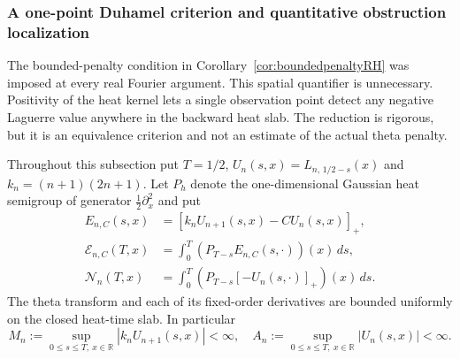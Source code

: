 \subsubsection{A one-point Duhamel criterion and quantitative obstruction localization}
\label{sec:onepointduhamel}
The bounded-penalty condition in Corollary~\ref{cor:boundedpenaltyRH}
was imposed at every real Fourier argument.  This spatial
quantifier is unnecessary.  Positivity of the heat kernel
lets a single observation point detect any negative
Laguerre value anywhere in the backward heat slab.
The reduction is rigorous, but it is an equivalence
criterion and not an estimate of the actual theta
penalty.

Throughout this subsection put $T=1/2$,
$U_n(s,x)=L_{n,\,1/2-s}(x)$ and
$k_n=(n+1)(2n+1)$.  Let $P_h$ denote the
one-dimensional Gaussian heat semigroup of
generator $\tfrac12\partial_x^2$ and put
\begin{align}
E_{n,C}(s,x)
 &= [k_nU_{n+1}(s,x)-CU_n(s,x)]_+,\nonumber\\
\mathcal E_{n,C}(T,x)
 &=\int_0^T(P_{T-s}E_{n,C}(s,\cdot))(x)\,ds,\nonumber\\
\mathcal N_n(T,x)
 &=\int_0^T(P_{T-s}[-U_n(s,\cdot)]_+)(x)\,ds.
\label{eq:onepointvariables}
\end{align}
The theta transform and each of its fixed-order
derivatives are bounded uniformly on the closed
heat-time slab.  In particular
\[
M_n:=\sup_{0\le s\le T,\ x\in\mathbb R}
|k_nU_{n+1}(s,x)|<\infty,
\quad
A_n:=\sup_{0\le s\le T,\ x\in\mathbb R}
|U_n(s,x)|<\infty.
\]

